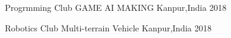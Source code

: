 \begin{cventries}

  \cventry
   {Progrmming Club}
   {GAME AI MAKING}
  {Kanpur,India}
  {2018}
  {}

  \cventry
   {Robotics Club}
   {Multi-terrain Vehicle}
  {Kanpur,India}
  {2018}
  {}
  
\end{cventries}